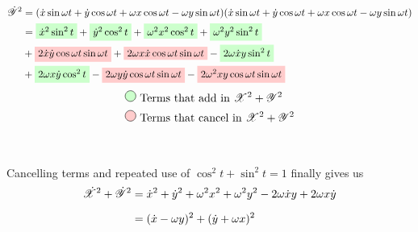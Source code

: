 \begin{align}
\begin{split}
\dot{\mathscr{Y}}^2 &= (\dot{x}\sin{\omega t} + \dot{y}\cos{\omega t} + \omega x\cos{\omega t} - \omega y\sin{\omega t})(\dot{x}\sin{\omega t} + \dot{y}\cos{\omega t} + \omega x\cos{\omega t} - \omega y\sin{\omega t}) \\
&=
\tikz[baseline]{
    \node[fill=green!20,anchor=base]
    {$\dot{x}^2\sin^2{t}$};
} +
\tikz[baseline]{
    \node[fill=green!20,anchor=base]
    {$\dot{y}^2\cos^2{t}$};
} +
\tikz[baseline]{
    \node[fill=green!20,anchor=base]
    {$\omega^2 x^2\cos^2{t}$};
} +
\tikz[baseline]{
    \node[fill=green!20,anchor=base]
    {$\omega^2 y^2\sin^2{t}$};
} \\
&+
\tikz[baseline]{
    \node[fill=red!20,anchor=base]
    {$2 \dot{x}\dot{y}\cos{\omega t}\sin{\omega t}$};
} +
\tikz[baseline]{
    \node[fill=red!20,anchor=base]
    {$2 \omega x \dot{x}\cos{\omega t}\sin{\omega t}$};
} -
\tikz[baseline]{
    \node[fill=green!20,anchor=base]
    {$2 \omega \dot{x}y\sin^2{t}$};
} \\
&+
\tikz[baseline]{
    \node[fill=green!20,anchor=base]
    {$2 \omega x \dot{y}\cos^2{t}$};
} -
\tikz[baseline]{
    \node[fill=red!20,anchor=base]
    {$2 \omega y \dot{y}\cos{\omega t}\sin{\omega t}$};
} -
\tikz[baseline]{
    \node[fill=red!20,anchor=base]
    {$2 \omega^2 x y \cos{\omega t}\sin{\omega t}$};
}
\end{split}
\end{align}
\begin{align}
\notag &\tikz\node [fill=green!20,draw,circle]{};\ \text{Terms that add in $\mathscr{X}^2 + \mathscr{Y}^2$} \\
\notag &\tikz\node [fill=red!20,draw,circle]{};\ \text{Terms that cancel in $\mathscr{X}^2 + \mathscr{Y}^2$} \\[1cm]
\end{align}
Cancelling terms and repeated use of $\cos^2{t} + \sin^2{t} = 1$ finally gives us
\begin{align}
\notag \dot{\mathscr{X}}^2 + \dot{\mathscr{Y}}^2 &= \dot{x}^2 + \dot{y}^2 + \omega^2 x^2 + \omega^2 y^2 - 2 \omega \dot{x} y + 2 \omega x \dot{y} \\[0.2cm]
&= (\dot{x}-\omega y)^2 + (\dot{y}+\omega x)^2
\end{align}

